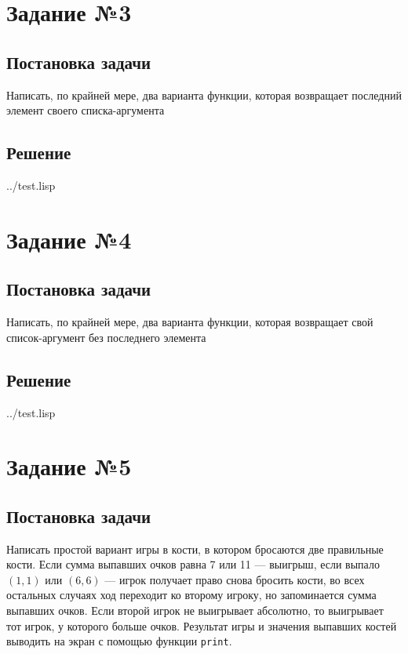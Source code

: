 \section*{Задание №3}
\subsection*{Постановка задачи}
Написать, по крайней мере, два варианта функции, которая возвращает последний элемент своего списка-аргумента

\subsection*{Решение}
\begin{lstinputlisting}[label=third,caption=Решение задания №3, language=lisp, firstline=1, lastline=7]{../test.lisp}

\end{lstinputlisting}

\section*{Задание №4}
\subsection*{Постановка задачи}
Написать, по крайней мере, два варианта функции, которая возвращает свой список-аргумент без последнего элемента

\subsection*{Решение}
\begin{lstinputlisting}[label=third,caption=Решение задания №3, language=lisp, firstline=15, lastline=26]{../test.lisp}
	
\end{lstinputlisting}

\section*{Задание №5}
\subsection*{Постановка задачи}
Написать простой вариант игры в кости, в котором бросаются две правильные кости. Если сумма выпавших очков равна 7 или 11 --- выигрыш, если выпало $(1, 1)$ или $(6, 6)$ --- игрок получает право снова бросить кости, во всех остальных случаях ход переходит ко второму игроку, но запоминается сумма выпавших очков. Если второй игрок не выигрывает абсолютно, то выигрывает тот игрок, у которого больше очков. Результат игры и значения выпавших костей выводить на экран с помощью функции \texttt{print}.

